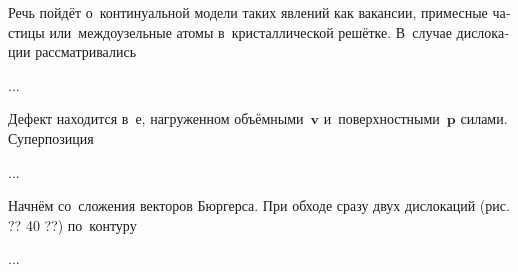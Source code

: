 \begin{otherlanguage}{russian}

Речь пойдёт о~континуальной модели таких явлений как вакансии, примесные частицы или~междоузельные атомы в~кристаллической решётке.
В~случае дислокации рассматривались

...


\end{otherlanguage}



\label{section:forceonpointdefect}

\begin{otherlanguage}{russian}

Дефект находится в~\rucontinuum{}е, нагруженном объёмными~$\bm{v}$ и~поверхностными~$\bm{p}$ силами.
Суперпозиция

...


\end{otherlanguage}



\label{section:dislocations.continuouslydistributed}

\begin{otherlanguage}{russian}

Начнём со~сложения векторов Бюргерса.
При обходе сразу двух дислокаций (рис. ?? 40 ??) по~контуру

...


\end{otherlanguage}


